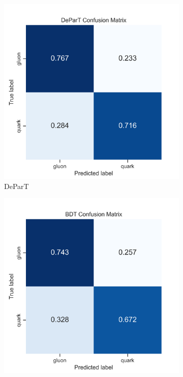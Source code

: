 
\begin{figure}[!htb]
	\centering
	\begin{subfigure}[t]{0.38\textwidth}
		\includegraphics[width=1\textwidth]{src/plots/results/cm/depart.png}
		\caption{DeParT}
		\label{fig:app_cm_depart}
	\end{subfigure}
	\begin{subfigure}[t]{0.38\textwidth}
		\includegraphics[width=1\textwidth]{src/plots/results/cm/bdt.png}

\end{subfigure}
\end{figure}
